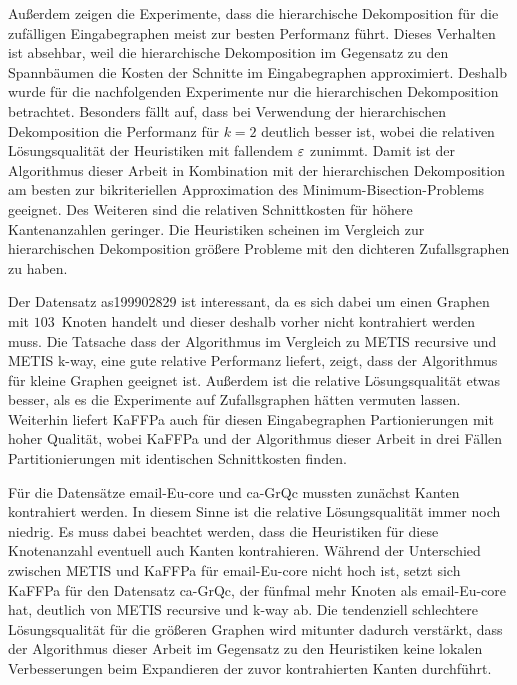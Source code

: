 Außerdem zeigen die Experimente, dass die hierarchische Dekomposition für die zufälligen Eingabegraphen meist zur besten Performanz führt.
Dieses Verhalten ist absehbar, weil die hierarchische Dekomposition im Gegensatz zu den Spannbäumen die Kosten der Schnitte im Eingabegraphen approximiert.
Deshalb wurde für die nachfolgenden Experimente nur die hierarchischen Dekomposition betrachtet.
Besonders fällt auf, dass bei Verwendung der hierarchischen Dekomposition die Performanz für $k=2$ deutlich besser ist, wobei die relativen Lösungsqualität der Heuristiken mit fallendem $\varepsilon$ zunimmt.
Damit ist der Algorithmus dieser Arbeit in Kombination mit der hierarchischen Dekomposition am besten zur bikriteriellen Approximation des Minimum-Bisection-Problems geeignet.
Des Weiteren sind die relativen Schnittkosten für höhere Kantenanzahlen geringer.
Die Heuristiken scheinen im Vergleich zur hierarchischen Dekomposition größere Probleme mit den dichteren Zufallsgraphen zu haben.

Der Datensatz as199902829 ist interessant, da es sich dabei um einen Graphen mit $103$~Knoten handelt und dieser deshalb vorher nicht kontrahiert werden muss.
Die Tatsache dass der Algorithmus im Vergleich zu METIS recursive und METIS k-way, eine gute relative Performanz liefert, zeigt, dass der Algorithmus für kleine Graphen geeignet ist.
Außerdem ist die relative Lösungsqualität etwas besser, als es die Experimente auf Zufallsgraphen hätten vermuten lassen.
Weiterhin liefert KaFFPa auch für diesen Eingabegraphen Partionierungen mit hoher Qualität, wobei KaFFPa und der Algorithmus dieser Arbeit in drei Fällen Partitionierungen mit identischen Schnittkosten finden.

Für die Datensätze email-Eu-core und ca-GrQc mussten zunächst Kanten kontrahiert werden.
In diesem Sinne ist die relative Lösungsqualität immer noch niedrig.
Es muss dabei beachtet werden, dass die Heuristiken für diese Knotenanzahl eventuell auch Kanten kontrahieren.
Während der Unterschied zwischen METIS und KaFFPa für email-Eu-core nicht hoch ist, setzt sich KaFFPa für den Datensatz ca-GrQc, der fünfmal mehr Knoten als email-Eu-core hat, deutlich von METIS recursive und k-way ab.
Die tendenziell schlechtere Lösungsqualität für die größeren Graphen wird mitunter dadurch verstärkt, dass der Algorithmus dieser Arbeit im Gegensatz zu den Heuristiken keine lokalen Verbesserungen beim Expandieren der zuvor kontrahierten Kanten durchführt.

